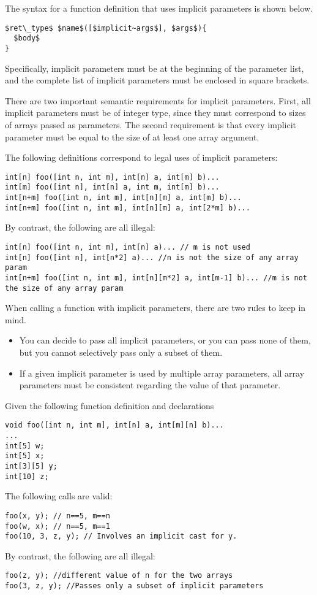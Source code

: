 The syntax for a function definition that uses implicit parameters is shown below. 
\begin{lstlisting}
$ret\_type$ $name$([$implicit~args$], $args$){
  $body$
}
\end{lstlisting}
Specifically, implicit parameters must be at the beginning of the parameter list, and the complete list of implicit parameters must be enclosed in square brackets.

There are two important semantic requirements for implicit parameters. First, all implicit parameters must be of integer type, since they must correspond to sizes of arrays passed as parameters. The second requirement is that every implicit parameter must be equal to the size of at least one array argument.

\begin{Example}
The following definitions correspond to legal uses of implicit parameters:
\begin{lstlisting}
int[n] foo([int n, int m], int[n] a, int[m] b)...
int[m] foo([int n], int[n] a, int m, int[m] b)...
int[n+m] foo([int n, int m], int[n][m] a, int[m] b)...
int[n+m] foo([int n, int m], int[n][m] a, int[2*m] b)...
\end{lstlisting}
By contrast, the following are all illegal:
\begin{lstlisting}
int[n] foo([int n, int m], int[n] a)... // m is not used
int[n] foo([int n], int[n*2] a)... //n is not the size of any array param
int[n+m] foo([int n, int m], int[n][m*2] a, int[m-1] b)... //m is not the size of any array param
\end{lstlisting}
\end{Example}

When calling a function with implicit parameters, there are two rules to keep in mind.
\begin{itemize}
\item You can decide to pass all implicit parameters, or you can pass none of them, but you cannot selectively pass only a subset of them.
\item If a given implicit parameter is used by multiple array parameters, all array parameters must be consistent regarding the value of that parameter.
\end{itemize}

\begin{Example}
Given the following function definition and declarations
\begin{lstlisting}
void foo([int n, int m], int[n] a, int[m][n] b)...
...
int[5] w;
int[5] x;
int[3][5] y;
int[10] z;
\end{lstlisting}
The following calls are valid:
\begin{lstlisting}
foo(x, y); // n==5, m==n
foo(w, x); // n==5, m==1
foo(10, 3, z, y); // Involves an implicit cast for y.
\end{lstlisting}

By contrast, the following are all illegal:
\begin{lstlisting}
foo(z, y); //different value of n for the two arrays
foo(3, z, y); //Passes only a subset of implicit parameters
\end{lstlisting}
\end{Example}



